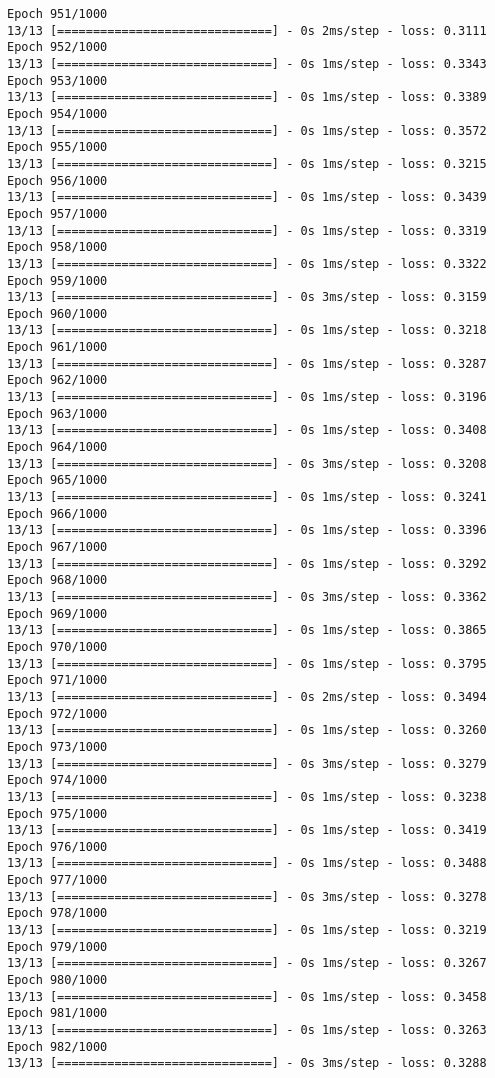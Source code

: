 \documentclass[11pt]{article}
\begin{document}
\begin{Verbatim}[commandchars=\\\{\}]
Epoch 951/1000
13/13 [==============================] - 0s 2ms/step - loss: 0.3111
Epoch 952/1000
13/13 [==============================] - 0s 1ms/step - loss: 0.3343
Epoch 953/1000
13/13 [==============================] - 0s 1ms/step - loss: 0.3389
Epoch 954/1000
13/13 [==============================] - 0s 1ms/step - loss: 0.3572
Epoch 955/1000
13/13 [==============================] - 0s 1ms/step - loss: 0.3215
Epoch 956/1000
13/13 [==============================] - 0s 1ms/step - loss: 0.3439
Epoch 957/1000
13/13 [==============================] - 0s 1ms/step - loss: 0.3319
Epoch 958/1000
13/13 [==============================] - 0s 1ms/step - loss: 0.3322
Epoch 959/1000
13/13 [==============================] - 0s 3ms/step - loss: 0.3159
Epoch 960/1000
13/13 [==============================] - 0s 1ms/step - loss: 0.3218
Epoch 961/1000
13/13 [==============================] - 0s 1ms/step - loss: 0.3287
Epoch 962/1000
13/13 [==============================] - 0s 1ms/step - loss: 0.3196
Epoch 963/1000
13/13 [==============================] - 0s 1ms/step - loss: 0.3408
Epoch 964/1000
13/13 [==============================] - 0s 3ms/step - loss: 0.3208
Epoch 965/1000
13/13 [==============================] - 0s 1ms/step - loss: 0.3241
Epoch 966/1000
13/13 [==============================] - 0s 1ms/step - loss: 0.3396
Epoch 967/1000
13/13 [==============================] - 0s 1ms/step - loss: 0.3292
Epoch 968/1000
13/13 [==============================] - 0s 3ms/step - loss: 0.3362
Epoch 969/1000
13/13 [==============================] - 0s 1ms/step - loss: 0.3865
Epoch 970/1000
13/13 [==============================] - 0s 1ms/step - loss: 0.3795
Epoch 971/1000
13/13 [==============================] - 0s 2ms/step - loss: 0.3494
Epoch 972/1000
13/13 [==============================] - 0s 1ms/step - loss: 0.3260
Epoch 973/1000
13/13 [==============================] - 0s 3ms/step - loss: 0.3279
Epoch 974/1000
13/13 [==============================] - 0s 1ms/step - loss: 0.3238
Epoch 975/1000
13/13 [==============================] - 0s 1ms/step - loss: 0.3419
Epoch 976/1000
13/13 [==============================] - 0s 1ms/step - loss: 0.3488
Epoch 977/1000
13/13 [==============================] - 0s 3ms/step - loss: 0.3278
Epoch 978/1000
13/13 [==============================] - 0s 1ms/step - loss: 0.3219
Epoch 979/1000
13/13 [==============================] - 0s 1ms/step - loss: 0.3267
Epoch 980/1000
13/13 [==============================] - 0s 1ms/step - loss: 0.3458
Epoch 981/1000
13/13 [==============================] - 0s 1ms/step - loss: 0.3263
Epoch 982/1000
13/13 [==============================] - 0s 3ms/step - loss: 0.3288

\end{Verbatim}
\end{document}
